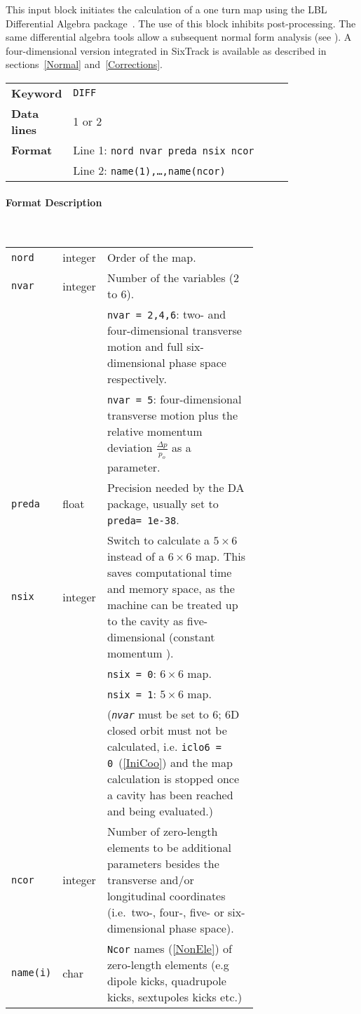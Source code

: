 This input block initiates the calculation of a one turn map using the LBL Differential Algebra package~\cite{DALIE}.
The use of this block inhibits post-processing.
The same differential algebra tools allow a subsequent normal form analysis (see \cite{Forest89}).
A four-dimensional version integrated in SixTrack is available as described in sections~\ref{Normal} and~\ref{Corrections}.

\bigskip
\begin{tabular}{@{}lp{0.8\linewidth}}
    \textbf{Keyword}    & \texttt{DIFF} \\
    \textbf{Data lines} & 1 or 2 \\
    \textbf{Format}     & Line 1: \texttt{nord nvar preda nsix ncor} \\
                        & Line 2: \texttt{name(1),\ldots,name(ncor)}
\end{tabular}

\paragraph{Format Description}~

\bigskip
\begin{longtabu}{@{}llp{0.7\linewidth}}
    \texttt{nord}    & integer & Order of the map. \\
    \texttt{nvar}    & integer & Number of the variables (2 to 6).\\
                     &         & \texttt{nvar = 2,4,6}: two- and four-dimensional transverse motion and full six-dimensional phase space respectively. \\
                     &         & \texttt{nvar = 5}: four-dimensional transverse motion plus the relative momentum deviation \mbox{$\frac{\Delta p}{p_o}$} as a parameter. \\
    \texttt{preda}   & float   & Precision needed by the DA package, usually set to \mbox{\texttt{preda= 1e-38}}. \\
    \texttt{nsix}    & integer & Switch to calculate a $5 \times 6$ instead of a $6 \times 6$ map. This saves computational time and memory space, as the machine can be treated up to the cavity as five-dimensional (constant momentum ). \\
                     &         & \texttt{nsix = 0}: $6 \times 6$ map. \\
                     &         & \texttt{nsix = 1}: $5 \times 6$ map. \\
                     &         & (\texttt{\em nvar} must be set to 6; 6D closed orbit must not be calculated, i.e. \mbox{\texttt{iclo6 = 0}}~(\ref{IniCoo}) and the map calculation is stopped once a cavity has been reached and being    evaluated.) \\
    \texttt{ncor}    & integer & Number of zero-length elements to be additional parameters besides the transverse and/or longitudinal coordinates (i.e.~two-, four-, five- or six-dimensional phase space). \\
    \texttt{name(i)} & char    & \texttt{Ncor} names (\ref{NonEle}) of zero-length elements (e.g dipole kicks, quadrupole kicks,   sextupoles kicks etc.)
\end{longtabu}

